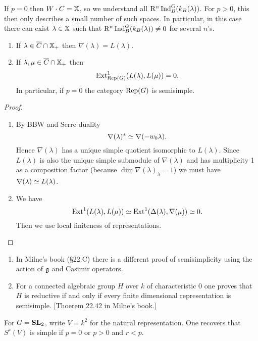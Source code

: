 	\begin{remark}
		If $p=0$ then $W\cdot C=\mathbb{X}$, so we understand all $\mathrm{R}^{n}\operatorname{Ind}_B^{G}(k_B(\lambda))$.
		For $p>0$, this then only describes a small number of such spaces. In particular, in
		this case there can exist $\lambda\in \mathbb{X}$ such that
		$\mathrm{R}^{n}\operatorname{Ind}_B^{G}(k_B(\lambda))\neq 0$ for several $n$'s.
	\end{remark}
	\begin{corollary}\leavevmode
		\begin{enumerate}[(1)]
			\item If $\lambda\in \overline{C}\cap \mathbb{X}_+$ then $\nabla(\lambda)=L(\lambda)$.
			\item If $\lambda,\mu\in \overline{C}\cap \mathbb{X}_+$ then
				\[
					\operatorname{Ext}_{\operatorname{Rep}(G)}^{1}(L(\lambda),L(\mu)) = 0.
				\]
				In particular, if $p=0$ the category $\operatorname{Rep}(G)$ is semisimple.
		\end{enumerate}
	\end{corollary}
	\begin{proof}\leavevmode
		\begin{enumerate}[(1)]
			\item By BBW and Serre duality
				\[
					\nabla(\lambda)^{*} \simeq \nabla(-w_0\lambda).
				\]
				Hence $\nabla(\lambda)$ has a unique simple quotient isomorphic to $L(\lambda)$.
				Since $L(\lambda)$ is also the unique simple submodule of $\nabla(\lambda)$ and has
				multiplicity 1 as a composition factor (because $\dim \nabla(\lambda)_\lambda=1$) we
				must have $\nabla(\lambda)\simeq L(\lambda)$.
			\item We have
				\[
					\operatorname{Ext} ^{1}(L(\lambda),L(\mu)) \simeq \operatorname{Ext} ^{1}(\Delta(\lambda), \nabla(\mu)) \simeq 0.
				\]
				Then we use local finiteness of representations.
		\end{enumerate}
	\end{proof}
	\begin{remark}\leavevmode
		\begin{enumerate}[(1)]
			\item In Milne's book (§22.C) there is a different proof of semisimplicity using the
				action of $\mathfrak g$ and Casimir operators.
			\item For a connected algebraic group $H$ over $k$ of characteristic 0 one proves that
				$H$ is reductive if and only if every finite dimensional representation is
				semisimple. [Thoerem 22.42 in Milne's book.]
		\end{enumerate}
	\end{remark}
	\begin{example}
		For $G=\mathbf{SL}_2$, write $V=k^2$ for the natural representation. One recovers that
		$S^{r}(V)$ is simple if $p=0$ or $p>0$ and $r<p$.
	\end{example}

